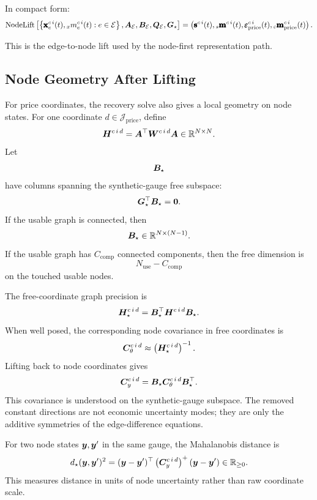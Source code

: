 In compact form:
\[
  \operatorname{NodeLift}
  \left[
    \left\{
      \pmb{\mathbf{x}}_{e}^{c\,i}(t),
      {}_{x}m_{e}^{c\,i}(t)
      :
      e\in\mathcal{E}
    \right\},
    \bm{A}_{\mathcal{E}},
    \bm{B}_{\mathcal{E}},
    \bm{Q}_{\mathcal{E}},
    \bm{G}_{\star}
  \right]
  =
  \left(
    \pmb{\mathbf{s}}^{c\,i}(t),
    {}_{s}\pmb{\mathbf{m}}^{c\,i}(t),
    \pmb{\mathbf{\varepsilon}}_{\mathrm{price}}^{c\,i}(t),
    {}_{\varepsilon}\pmb{\mathbf{m}}_{\mathrm{price}}^{c\,i}(t)
  \right).
\]

This is the edge-to-node lift used by the node-first representation path.

\subsection{Node Geometry After Lifting}
\label{subsec:node-geometry-after-lifting}

For price coordinates, the recovery solve also gives a local geometry on node
states.  For one coordinate $d\in\mathcal{J}_{\mathrm{price}}$, define
\[
  \bm{H}^{c\,i\,d}
  =
  \bm{A}^{\top}
  \bm{W}^{c\,i\,d}
  \bm{A}
  \in
  \mathbb{R}^{N\times N}.
\]
Let
\[
  \bm{B}_{\star}
\]
have columns spanning the synthetic-gauge free subspace:
\[
  \bm{G}_{\star}^{\top}\bm{B}_{\star}=\bm{0}.
\]
If the usable graph is connected, then
\[
  \bm{B}_{\star}\in\mathbb{R}^{N\times(N-1)}.
\]
If the usable graph has $C_{\mathrm{comp}}$ connected components, then the free
dimension is
\[
  N_{\mathrm{use}}-C_{\mathrm{comp}}
\]
on the touched usable nodes.

The free-coordinate graph precision is
\[
  \bm{H}_{\star}^{c\,i\,d}
  =
  \bm{B}_{\star}^{\top}
  \bm{H}^{c\,i\,d}
  \bm{B}_{\star}.
\]
When well posed, the corresponding node covariance in free coordinates is
\[
  \bm{C}_{\theta}^{c\,i\,d}
  \approx
  \left(
    \bm{H}_{\star}^{c\,i\,d}
  \right)^{-1}.
\]
Lifting back to node coordinates gives
\[
  \bm{C}_{y}^{c\,i\,d}
  =
  \bm{B}_{\star}
  \bm{C}_{\theta}^{c\,i\,d}
  \bm{B}_{\star}^{\top}.
\]
This covariance is understood on the synthetic-gauge subspace.  The removed
constant directions are not economic uncertainty modes; they are only the
additive symmetries of the edge-difference equations.

For two node states $\bm{y},\bm{y}'$ in the same gauge, the Mahalanobis
distance is
\[
  d_{\star}(\bm{y},\bm{y}')^2
  =
  (\bm{y}-\bm{y}')^{\top}
  \left(
    \bm{C}_{y}^{c\,i\,d}
  \right)^{+}
  (\bm{y}-\bm{y}')
  \in
  \mathbb{R}_{\ge 0}.
\]
This measures distance in units of node uncertainty rather than raw coordinate
scale.

